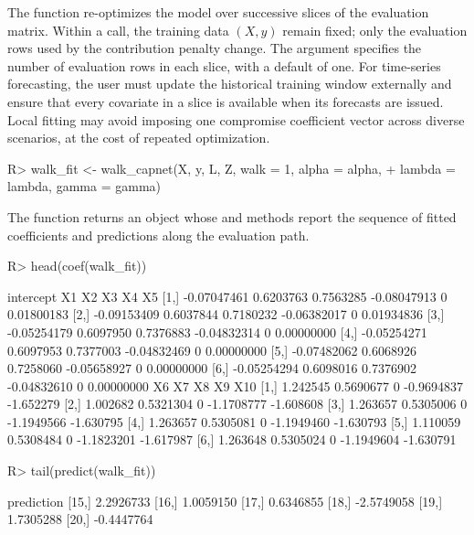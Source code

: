 \documentclass[article,shortnames,nofooter]{jss}
\begin{document}
The  function re-optimizes the model over successive slices of the evaluation matrix. Within a call, the training data $(X,y)$ remain fixed; only the evaluation rows used by the contribution penalty change. The  argument specifies the number of evaluation rows in each slice, with a default of one. For time-series forecasting, the user must update the historical training window externally and ensure that every covariate in a slice is available when its forecasts are issued. Local fitting may avoid imposing one compromise coefficient vector across diverse scenarios, at the cost of repeated optimization.

\begin{Code}
    R> walk_fit <- walk_capnet(X, y, L, Z, walk = 1, alpha = alpha,
    +    lambda = lambda, gamma = gamma)
\end{Code}

The function returns an  object whose  and  methods report the sequence of fitted coefficients and predictions along the evaluation path.

\begin{CodeChunk}
\begin{CodeInput}
    R> head(coef(walk_fit))
\end{CodeInput}
\begin{CodeOutput}
           intercept        X1        X2          X3 X4         X5
    [1,] -0.07047461 0.6203763 0.7563285 -0.08047913  0 0.01800183
    [2,] -0.09153409 0.6037844 0.7180232 -0.06382017  0 0.01934836
    [3,] -0.05254179 0.6097950 0.7376883 -0.04832314  0 0.00000000
    [4,] -0.05254271 0.6097953 0.7377003 -0.04832469  0 0.00000000
    [5,] -0.07482062 0.6068926 0.7258060 -0.05658927  0 0.00000000
    [6,] -0.05254294 0.6098016 0.7376902 -0.04832610  0 0.00000000
               X6        X7 X8         X9       X10
    [1,] 1.242545 0.5690677  0 -0.9694837 -1.652279
    [2,] 1.002682 0.5321304  0 -1.1708777 -1.608608
    [3,] 1.263657 0.5305006  0 -1.1949566 -1.630795
    [4,] 1.263657 0.5305081  0 -1.1949460 -1.630793
    [5,] 1.110059 0.5308484  0 -1.1823201 -1.617987
    [6,] 1.263648 0.5305024  0 -1.1949604 -1.630791
\end{CodeOutput}
\end{CodeChunk}

\begin{CodeChunk}
\begin{CodeInput}
    R> tail(predict(walk_fit))
\end{CodeInput}
\begin{CodeOutput}
          prediction
    [15,]  2.2926733
    [16,]  1.0059150
    [17,]  0.6346855
    [18,] -2.5749058
    [19,]  1.7305288
    [20,] -0.4447764
\end{CodeOutput}
\end{CodeChunk}
\end{document}
